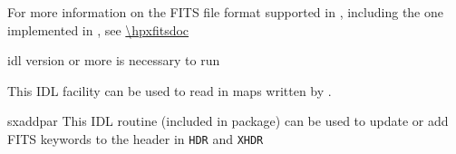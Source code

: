 \begin{codedescription}
{For more information on the FITS file format supported in \healpix, 
including the one implemented in \facname,
see \url{\hpxfitsdoc}}

\end{codedescription}



\begin{related}
  \begin{sulist}{} %
  \item[idl] version \idlversion or more is necessary to run \facname
  \item[\htmlref{read\_fits\_partial}{idl:read_fits_partial}] This \healpix IDL facility can be used to read in maps
  written by \facname.

  \item[sxaddpar] This IDL routine (included in \healpix package) can be used to update
  or add FITS keywords to the header in {\tt HDR} and {\tt XHDR}
  \end{sulist}
\end{related}


